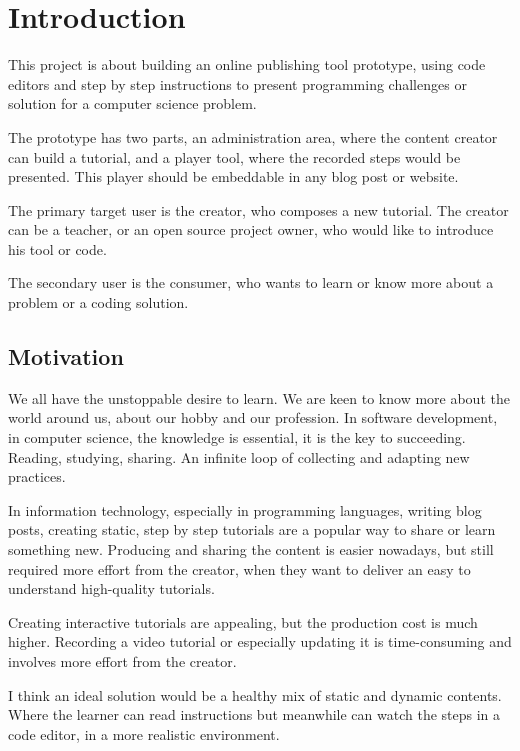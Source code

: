 \chapter{Introduction}

This project is about building an online publishing tool prototype, using code editors and step by step instructions to present programming challenges or solution for a computer science problem.

The prototype has two parts, an administration area, where the content creator can build a tutorial, and a player tool, where the recorded steps would be presented. This player should be embeddable in any blog post or website.

The primary target user is the creator, who composes a new tutorial. The creator can be a teacher, or an open source project owner, who would like to introduce his tool or code.

The secondary user is the consumer, who wants to learn or know more about a problem or a coding solution.

\section{Motivation}

We all have the unstoppable desire to learn. We are keen to know more about the world around us, about our hobby and our profession. In software development, in computer science, the knowledge is essential, it is the key to succeeding. Reading, studying, sharing. An infinite loop of collecting and adapting new practices.

In information technology, especially in programming languages, writing blog posts, creating static, step by step tutorials are a popular way to share or learn something new. Producing and sharing the content is easier nowadays, but still required more effort from the creator, when they want to deliver an easy to understand high-quality tutorials.

Creating interactive tutorials are appealing, but the production cost is much higher. Recording a video tutorial or especially updating it is time-consuming and involves more effort from the creator.

I think an ideal solution would be a healthy mix of static and dynamic contents. Where the learner can read instructions but meanwhile can watch the steps in a code editor, in a more realistic environment.
